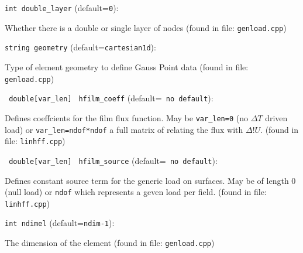 \item\verb+int double_layer+ {\rm(default=\verb|0|)}:

Whether there is a double or single layer of nodes
 (found in file: \verb+genload.cpp+)
\item\verb+string geometry+ {\rm(default=\verb|cartesian1d|)}:

Type of element geometry to define Gauss Point data
 (found in file: \verb+genload.cpp+)
\item\verb+ double[var_len]+ \verb+ hfilm_coeff+ {\rm(default=\verb| no default|)}:
 
Defines coeffcients for the film flux function. May be 
 \verb+var_len=0+  (no $\Delta T$ driven load) or
 \verb+var_len=ndof*ndof+  a full matrix of relating the flux with
$\Delta !U$. 
  (found in file: \verb+linhff.cpp+)
\item\verb+ double[var_len]+ \verb+ hfilm_source+ {\rm(default=\verb| no default|)}:
 
Defines constant source term for the generic load on
surfaces. May be of length 0 (null load) or  \verb+ndof+ 
which represents a geven load per field. 
  (found in file: \verb+linhff.cpp+)
\item\verb+int ndimel+ {\rm(default=\verb|ndim-1|)}:

The dimension of the element 
 (found in file: \verb+genload.cpp+)
